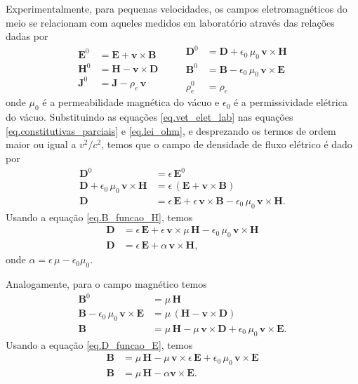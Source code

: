 Experimentalmente, para pequenas velocidades, os campos eletromagn\'eticos do meio se relacionam com aqueles medidos em laborat\'orio atrav\'es das rela\c{c}\~oes dadas por \cite{eringen_1963}
\begin{equation}\label{eq.vet_elet_lab}
\begin{aligned}
\mathbf{E}^0&=\mathbf{E}+\mathbf{v}\times\mathbf{B}\\
\mathbf{H}^0&=\mathbf{H}-\mathbf{v}\times\mathbf{D}\\
\mathbf{J}^0&=\mathbf{J}-\rho_e\,\mathbf{v}
\end{aligned}
\qquad
\begin{aligned}
\mathbf{D}^0&=\mathbf{D}+\epsilon_0\,\mu_0\,\mathbf{v}\times\mathbf{H}\\
\mathbf{B}^0&=\mathbf{B}-\epsilon_0\,\mu_0\,\mathbf{v}\times\mathbf{E}\\
\rho_e^0&=\rho_e
\end{aligned}
\end{equation}
onde $\mu_0$ \'e a permeabilidade magn\'etica do v\'acuo e $\epsilon_0$ \'e a permissividade el\'etrica do v\'acuo. Substituindo as equa\c{c}\~oes \ref{eq.vet_elet_lab} nas equa\c{c}\~oes \ref{eq.constitutivas_parciais} e \ref{eq.lei_ohm}, e desprezando os termos de ordem maior ou igual a $v^2/c^2$, temos que o campo de densidade de fluxo el\'etrico \'e dado por
\begin{align*}
\mathbf{D}^0&=\epsilon\,\mathbf{E}^0\\
\mathbf{D}+\epsilon_0\,\mu_0\,\mathbf{v}\times\mathbf{H}&=\epsilon\,(\mathbf{E}+\mathbf{v}\times\mathbf{B})\\
\mathbf{D}&=\epsilon\,\mathbf{E}+\epsilon\,\mathbf{v}\times\mathbf{B}-\epsilon_0\,\mu_0\,\mathbf{v}\times\mathbf{H}.
\end{align*}
Usando a equa\c{c}\~ao \ref{eq.B_funcao_H}, temos
\begin{align}\label{eq.constitutiva_1}\nonumber
\mathbf{D}&=\epsilon\,\mathbf{E}+\epsilon\,\mathbf{v}\times\mu\,\mathbf{H}-\epsilon_0\,\mu_0\,\mathbf{v}\times\mathbf{H}\\
\mathbf{D}&=\epsilon\,\mathbf{E}+\alpha\,\mathbf{v}\times\mathbf{H},
\end{align}
onde $\alpha=\epsilon\,\mu-\epsilon_0\mu_0$.

Analogamente, para o campo magn\'etico temos
\begin{align*}
\mathbf{B}^0&=\mu\,\mathbf{H}\\
\mathbf{B}-\epsilon_0\,\mu_0\,\mathbf{v}\times\mathbf{E}&=\mu\,(\mathbf{H}-\mathbf{v}\times\mathbf{D})\\
\mathbf{B}&=\mu\,\mathbf{H}-\mu\,\mathbf{v}\times\mathbf{D}+\epsilon_0\,\mu_0\,\mathbf{v}\times\mathbf{E}.
\end{align*}
Usando a equa\c{c}\~ao \ref{eq.D_funcao_E}, temos
\begin{align}\label{eq.constitutiva_2}\nonumber
\mathbf{B}&=\mu\,\mathbf{H}-\mu\,\mathbf{v}\times\epsilon\,\mathbf{E}+\epsilon_0\,\mu_0\,\mathbf{v}\times\mathbf{E}\\
\mathbf{B}&=\mu\,\mathbf{H}-\alpha\mathbf{v}\times\mathbf{E}.
\end{align}

